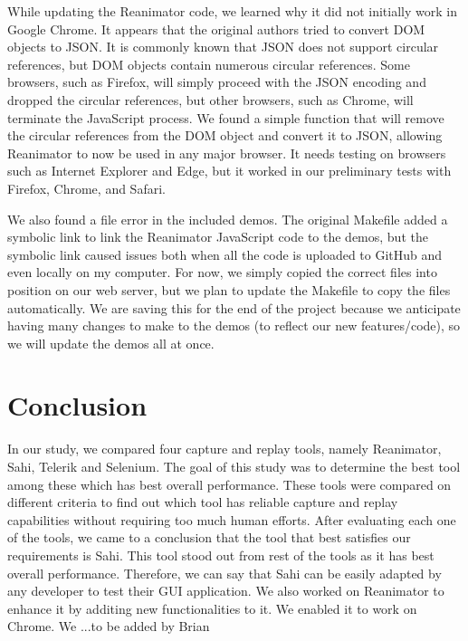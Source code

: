 \documentclass[12pt,journal]{IEEEtran}
\begin{document}
While updating the Reanimator code, we learned why it did not initially work in Google Chrome. It appears that the original authors tried to convert DOM objects to JSON. It is commonly known that JSON does not support circular references, but DOM objects contain numerous circular references. Some browsers, such as Firefox, will simply proceed with the JSON encoding and dropped the circular references, but other browsers, such as Chrome, will terminate the JavaScript process. We found a simple function that will remove the circular references from the DOM object and convert it to JSON, allowing Reanimator to now be used in any major browser. It needs testing on browsers such as Internet Explorer and Edge, but it worked in our preliminary tests with Firefox, Chrome, and Safari.

We also found a file error in the included demos. The original Makefile added a symbolic link to link the Reanimator JavaScript code to the demos, but the symbolic link caused issues both when all the code is uploaded to GitHub and even locally on my computer. For now, we simply copied the correct files into position on our web server, but we plan to update the Makefile to copy the files automatically. We are saving this for the end of the project because we anticipate having many changes to make to the demos (to reflect our new features/code), so we will update the demos all at once.


\section{Conclusion}
In our study, we compared four capture and replay tools, namely Reanimator, Sahi, Telerik and Selenium. The goal of this study was to determine the best tool among these which has best overall performance. These tools were compared on different criteria to find out which tool has reliable capture and replay capabilities without requiring too much human efforts. After evaluating each one of the tools, we came to a conclusion that the tool that best satisfies our requirements is Sahi. This tool stood out from rest of the tools as it has best overall performance. Therefore, we can say that Sahi can be easily adapted by any developer to test their GUI application. We also worked on Reanimator to enhance it by additing new functionalities to it. We enabled it to work on Chrome. We ...{to be added by Brian}



%


\printbibliography
\end{document}
